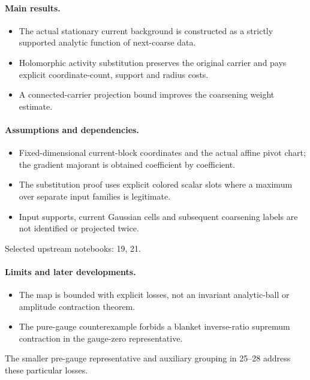\documentclass[11pt]{article}
\theoremstyle{remark}
\begin{document}
\paragraph{Main results.}
\begin{itemize}
\item The actual stationary current background is constructed as a strictly supported analytic function of next-coarse data.
\item Holomorphic activity substitution preserves the original carrier and pays explicit coordinate-count, support and radius costs.
\item A connected-carrier projection bound improves the coarsening weight estimate.
\end{itemize}

\paragraph{Assumptions and dependencies.}
\begin{itemize}
\item Fixed-dimensional current-block coordinates and the actual affine pivot chart; the gradient majorant is obtained coefficient by coefficient.
\item The substitution proof uses explicit colored scalar slots where a maximum over separate input families is legitimate.
\item Input supports, current Gaussian cells and subsequent coarsening labels are not identified or projected twice.
\end{itemize}

Selected upstream notebooks: 19, 21.\par

\paragraph{Limits and later developments.}
\begin{itemize}
\item The map is bounded with explicit losses, not an invariant analytic-ball or amplitude contraction theorem.
\item The pure-gauge counterexample forbids a blanket inverse-ratio supremum contraction in the gauge-zero representative.
\end{itemize}

The smaller pre-gauge representative and auxiliary grouping in 25--28 address these particular losses.
\end{document}
